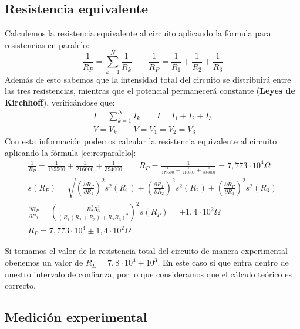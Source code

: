 \documentclass[12pt, a4paper, titlepage]{article}
\begin{document}
  \subsection{Resistencia equivalente}
  \label{sec:reseqparalelo}

  Calculemos la resistencia equivalente al circuito aplicando la fórmula para resistencias en paralelo:
  \begin{equation}
      \label{ec:resparalelo}
      \frac{1}{R_P} = \sum^N_{k=1} \frac{1}{R_k} \qquad \frac{1}{R_P} = \frac{1}{R_1} + \frac{1}{R_2} + \frac{1}{R_3}
  \end{equation}
  Además de esto sabemos que la intensidad total del circuito se distribuirá entre las tres resistencias, mientras que el potencial permanecerá constante (\textbf{Leyes de Kirchhoff}), verificándose que:
  \begin{gather}
      I = \sum^N_{k=1} I_k \qquad I = I_1 + I_2 + I_3 \nonumber \\
      V = V_k \qquad V = V_1 = V_2 = V_3 \label{ec:kripar}
  \end{gather}
  Con esta información podemos calcular la resistencia equivalente al circuito aplicando la fórmula \ref{ec:resparalelo}:
  \begin{gather}
      \frac{1}{R_P} = \frac{1}{175500} + \frac{1}{216000} + \frac{1}{394000} \qquad R_P = \frac{1}{\frac{1}{175500} + \frac{1}{216000} + \frac{1}{394000}} = 7,773 \cdot 10^4 \Omega \nonumber \\
      s(R_P) = \sqrt{\left ( \frac{\partial R_P}{\partial R_1} \right )^2 s^2(R_1) + \left ( \frac{\partial R_P}{\partial R_2} \right )^2 s^2(R_2) + \left ( \frac{\partial R_P}{\partial R_3} \right )^2 s^2(R_3)} \nonumber \\
      \frac{\partial R_P}{\partial R_1} = \left ( \frac{R_2^2 R_3^2}{(R_1(R_2+R_3) + R_2R_3)^2} \right )^2
      s(R_P) = \pm1,4\cdot10^2 \Omega \nonumber \\
      R_P = 7,773 \cdot 10^4 \pm1,4\cdot10^2 \Omega \nonumber
  \end{gather}

  Si tomamos el valor de la resistencia total del circuito de manera experimental obenemos un valor de $R_E = 7,8 \cdot 10^4 \pm 10^3$. En este caso si que entra dentro de nuestro intervalo de confianza, por lo que consideramos que el cálculo teórico es correcto.

  \subsection{Medición experimental}
\end{document}
